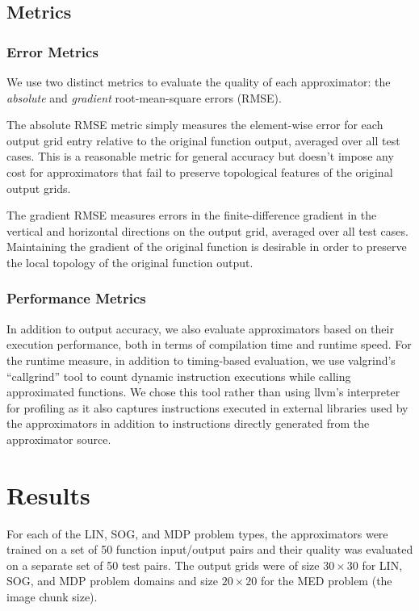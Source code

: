 \documentclass{article}
\begin{document}
\subsection{Metrics}

\subsubsection{Error Metrics}
We use two distinct metrics to evaluate the quality of each approximator: the \textit{absolute} and \textit{gradient} root-mean-square errors (RMSE).

The absolute RMSE metric simply measures the element-wise error for each output grid entry relative to the original function output, averaged over all test cases. This is a reasonable metric for general accuracy but doesn't impose any cost for approximators that fail to preserve topological features of the original output grids.

The gradient RMSE measures errors in the finite-difference gradient in the vertical and horizontal directions on the output grid, averaged over all test cases. Maintaining the gradient of the original function is desirable in order to preserve the local topology of the original function output.
\subsubsection{Performance Metrics}

In addition to output accuracy, we also evaluate approximators based on their execution performance, both in terms of compilation time and runtime speed. For the runtime measure, in addition to timing-based evaluation, we use valgrind's ``callgrind'' tool to count dynamic instruction executions while calling approximated functions. We chose this tool rather than using llvm's interpreter for profiling as it also captures instructions executed in external libraries used by the approximators in addition to instructions directly generated from the approximator source.

\section{Results}

For each of the LIN, SOG, and MDP problem types, the approximators were trained on a set of 50 function input/output pairs and their quality was evaluated on a separate set of 50 test pairs. The output grids were of size $30 \times 30$ for LIN, SOG, and MDP problem domains and size $20 \times 20$ for the MED problem (the image chunk size).
\end{document}

